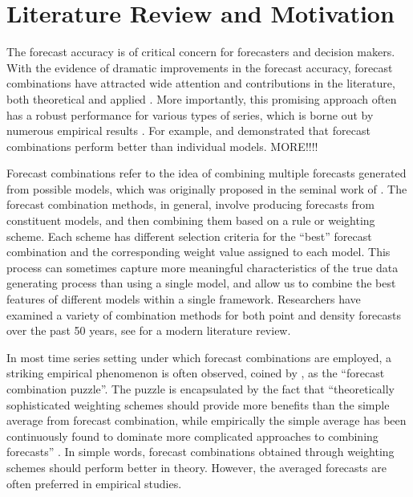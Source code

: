 \documentclass{monashthesis}
\begin{document}
\hypertarget{literature-review-and-motivation}{%
\section{Literature Review and Motivation}\label{literature-review-and-motivation}}

The forecast accuracy is of critical concern for forecasters and decision makers. With the evidence of dramatic improvements in the forecast accuracy, forecast combinations have attracted wide attention and contributions in the literature, both theoretical and applied \autocite{C89,T06}. More importantly, this promising approach often has a robust performance for various types of series, which is borne out by numerous empirical results \autocite{A11}. For example, \textcite{MACF82} and \textcite{SW98} demonstrated that forecast combinations perform better than individual models. MORE!!!!

Forecast combinations refer to the idea of combining multiple forecasts generated from possible models, which was originally proposed in the seminal work of \textcite{BG69}. The forecast combination methods, in general, involve producing forecasts from constituent models, and then combining them based on a rule or weighting scheme. Each scheme has different selection criteria for the ``best'' forecast combination and the corresponding weight value assigned to each model. This process can sometimes capture more meaningful characteristics of the true data generating process than using a single model, and allow us to combine the best features of different models within a single framework. Researchers have examined a variety of combination methods for both point and density forecasts over the past 50 years, see \textcite{WHLK22} for a modern literature review.

In most time series setting under which forecast combinations are employed, a striking empirical phenomenon is often observed, coined by \textcite{SW04}, as the ``forecast combination puzzle''. The puzzle is encapsulated by the fact that ``theoretically sophisticated weighting schemes should provide more benefits than the simple average from forecast combination, while empirically the simple average has been continuously found to dominate more complicated approaches to combining forecasts'' \autocite{WHLK22}. In simple words, forecast combinations obtained through weighting schemes should perform better in theory. However, the averaged forecasts are often preferred in empirical studies.
\end{document}
